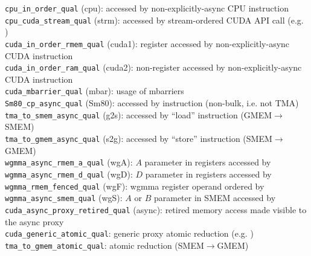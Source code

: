 \texttt{cpu\_in\_order\_qual} (cpu): accessed by non-explicitly-async CPU instruction\\
\texttt{cpu\_cuda\_stream\_qual} (strm): accessed by stream-ordered CUDA API call (e.g. )\\
\texttt{cuda\_in\_order\_rmem\_qual} (cuda1): register accessed by non-explicitly-async CUDA instruction\\
\texttt{cuda\_in\_order\_ram\_qual} (cuda2): non-register accessed by non-explicitly-async CUDA instruction\\
\texttt{cuda\_mbarrier\_qual} (mbar): usage of mbarriers\\
\texttt{Sm80\_cp\_async\_qual} (Sm80): accessed by  instruction (non-bulk, i.e. not TMA)\\
\texttt{tma\_to\_smem\_async\_qual} (g2s): accessed by  ``load'' instruction (GMEM$\to$SMEM)\\
\texttt{tma\_to\_gmem\_async\_qual} (s2g): accessed by  ``store'' instruction (SMEM$\to$GMEM)\\
\texttt{wgmma\_async\_rmem\_a\_qual} (wgA): $A$ parameter in registers accessed by \\
\texttt{wgmma\_async\_rmem\_d\_qual} (wgD): $D$ parameter in registers accessed by \\
\texttt{wgmma\_rmem\_fenced\_qual} (wgF): wgmma register operand ordered by \\
\texttt{wgmma\_async\_smem\_qual} (wgS): $A$ or $B$ parameter in SMEM accessed by \\
\texttt{cuda\_async\_proxy\_retired\_qual} (async): retired memory access made visible to the async proxy\\
\texttt{cuda\_generic\_atomic\_qual}: generic proxy atomic reduction (e.g. )\\
\texttt{tma\_to\_gmem\_atomic\_qual}:  atomic reduction (SMEM$\to$GMEM)\\
